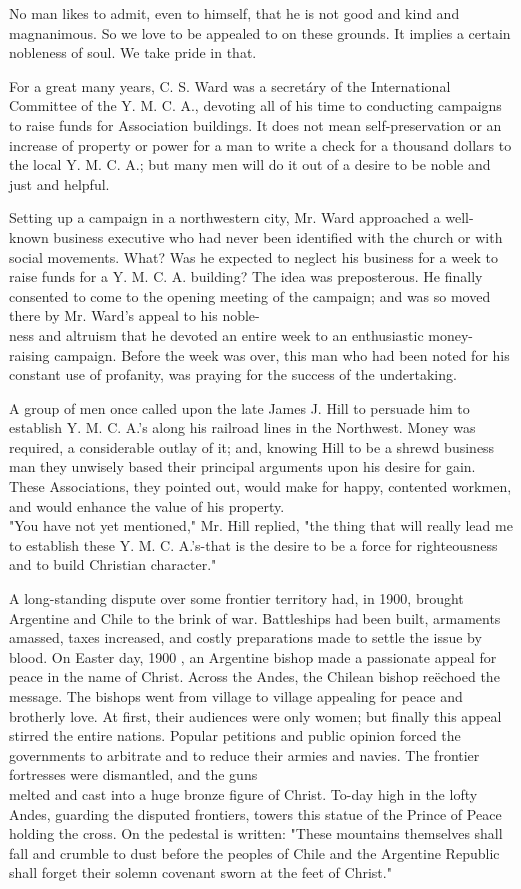 \documentclass[10pt]{article}
\begin{document}
No man likes to admit, even to himself, that he is not good and kind and magnanimous. So we love to be appealed to on these grounds. It implies a certain nobleness of soul. We take pride in that.

For a great many years, C. S. Ward was a secretáry of the International Committee of the Y. M. C. A., devoting all of his time to conducting campaigns to raise funds for Association buildings. It does not mean self-preservation or an increase of property or power for a man to write a check for a thousand dollars to the local Y. M. C. A.; but many men will do it out of a desire to be noble and just and helpful.

Setting up a campaign in a northwestern city, Mr. Ward approached a well-known business executive who had never been identified with the church or with social movements. What? Was he expected to neglect his business for a week to raise funds for a Y. M. C. A. building? The idea was preposterous. He finally consented to come to the opening meeting of the campaign; and was so moved there by Mr. Ward's appeal to his noble-\\
ness and altruism that he devoted an entire week to an enthusiastic money-raising campaign. Before the week was over, this man who had been noted for his constant use of profanity, was praying for the success of the undertaking.

A group of men once called upon the late James J. Hill to persuade him to establish Y. M. C. A.'s along his railroad lines in the Northwest. Money was required, a considerable outlay of it; and, knowing Hill to be a shrewd business man they unwisely based their principal arguments upon his desire for gain. These Associations, they pointed out, would make for happy, contented workmen, and would enhance the value of his property.\\
"You have not yet mentioned," Mr. Hill replied, "the thing that will really lead me to establish these Y. M. C. A.'s-that is the desire to be a force for righteousness and to build Christian character."

A long-standing dispute over some frontier territory had, in 1900, brought Argentine and Chile to the brink of war. Battleships had been built, armaments amassed, taxes increased, and costly preparations made to settle the issue by blood. On Easter day, 1900 , an Argentine bishop made a passionate appeal for peace in the name of Christ. Across the Andes, the Chilean bishop reëchoed the message. The bishops went from village to village appealing for peace and brotherly love. At first, their audiences were only women; but finally this appeal stirred the entire nations. Popular petitions and public opinion forced the governments to arbitrate and to reduce their armies and navies. The frontier fortresses were dismantled, and the guns\\
melted and cast into a huge bronze figure of Christ. To-day high in the lofty Andes, guarding the disputed frontiers, towers this statue of the Prince of Peace holding the cross. On the pedestal is written: "These mountains themselves shall fall and crumble to dust before the peoples of Chile and the Argentine Republic shall forget their solemn covenant sworn at the feet of Christ."
\end{document}
